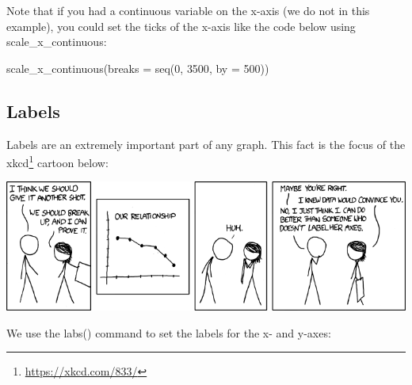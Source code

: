 \documentclass[
]{krantz}
\makeatletter
\newenvironment{Shaded}{\begin{snugshade}}{\end{snugshade}}
\newcommand{\AttributeTok}[1]{\textcolor[rgb]{0.61,0.61,0.61}{#1}}
\newcommand{\DecValTok}[1]{\textcolor[rgb]{0.06,0.06,0.06}{#1}}
\newcommand{\FunctionTok}[1]{\textcolor[rgb]{0,0,0}{#1}}
\newcommand{\NormalTok}[1]{#1}
\renewcommand{\href}[2]{#2\footnote{\url{#1}}}
\newenvironment{kframe}{%
\medskip{}
\setlength{\fboxsep}{.8em}
 \def\at@end@of@kframe{}%
 \ifinner\ifhmode%
  \def\at@end@of@kframe{\end{minipage}}%
  \begin{minipage}{\columnwidth}%
 \fi\fi%
 \def\FrameCommand##1{\hskip\@totalleftmargin \hskip-\fboxsep
 \colorbox{shadecolor}{##1}\hskip-\fboxsep
     \hskip-\linewidth \hskip-\@totalleftmargin \hskip\columnwidth}%
 \MakeFramed {\advance\hsize-\width
   \@totalleftmargin\z@ \linewidth\hsize
   \@setminipage}}%
 {\par\unskip\endMakeFramed%
 \at@end@of@kframe}
\renewenvironment{Shaded}{\begin{kframe}}{\end{kframe}}
\makeatother
\begin{document}
Note that if you had a continuous variable on the x-axis (we do not in this example), you could set the ticks of the x-axis like the code below using scale\_x\_continuous:

\begin{Shaded}
\begin{Highlighting}[]
\FunctionTok{scale\_x\_continuous}\NormalTok{(}\AttributeTok{breaks =} \FunctionTok{seq}\NormalTok{(}\DecValTok{0}\NormalTok{, }\DecValTok{3500}\NormalTok{, }\AttributeTok{by =} \DecValTok{500}\NormalTok{))}
\end{Highlighting}
\end{Shaded}

\hypertarget{labels}{%
\subsection{Labels}\label{labels}}

Labels are an extremely important part of any graph. This fact is the focus of the \href{https://xkcd.com/833/}{xkcd} cartoon below:

\includegraphics[width=0.8\linewidth]{ch_graphing/images/convincing}

We use the labs() command to set the labels for the x- and y-axes:
\end{document}
